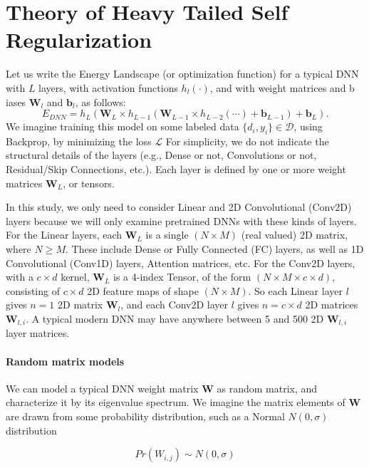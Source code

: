 
\section{Theory of Heavy Tailed Self Regularization}
\label{sxn:theory}


Let us write the Energy Landscape (or optimization function) for a typical DNN with $L$ layers, with activation functions $h_{l}(\cdot)$, and with weight matrices and b
iases $\mathbf{W}_{l}$ and $\mathbf{b}_{l}$, as follows:
\begin{equation}
E_{DNN}=h_{L}(\mathbf{W}_{L}\times h_{L-1}(\mathbf{W}_{L-1}\times h_{L-2}(\cdots)+\mathbf{b}_{L-1})+\mathbf{b}_{L})  .
\label{eqn:dnn_energy}
\end{equation}
We imagine training this model on some labeled data $\{d_{i},y_{i}\}\in\mathcal{D}$, using Backprop, by minimizing the loss $\mathcal{L}$
For simplicity, we do not indicate the structural details of the layers (e.g., Dense or not, Convolutions or not, Residual/Skip Connections, etc.). 
Each layer is defined by one or more weight matrices $\mathbf{W}_{L}$, or tensors.

In this study, we only need to consider Linear and 2D Convolutional (Conv2D) layers because we will only examine pretrained DNNs with these kinds of layers.
For the Linear layers, each $\mathbf{W}_{L}$ is a single $(N\times M)$ (real valued) 2D matrix, where $N\ge M$. 
These include Dense or Fully Connected (FC) layers, as well as 1D Convolutional (Conv1D) layers, Attention matrices, etc.
For the Conv2D layers, with a $c\times d$ kernel, $\mathbf{W}_{L}$ is a 4-index Tensor, of the form $(N\times M \times c\times d)$, consisting
of $c\times d$ 2D feature maps of shape $(N\times M)$.   So each Linear layer $l$ gives $n=1$ 2D matrix $\mathbf{W}_{l}$, and each Conv2D layer $l$ gives $n=c\times d$ 2D matrices $\mathbf{W}_{l,i}$. A typical modern DNN may have anywhere between 5 and 500 2D $\mathbf{W}_{l,i}$ layer matrices.

\paragraph{Random matrix models} 

We can model a typical DNN weight matrix $\mathbf{W}$ as random matrix, and characterize it by its eigenvalue spectrum.  We imagine the matrix elements of $\mathbf{W}$ 
are drawn from some probability distribution, such as a Normal $N(0,\sigma)$ distribution

$$Pr(W_{i,j})\sim N(0,\sigma)$$

